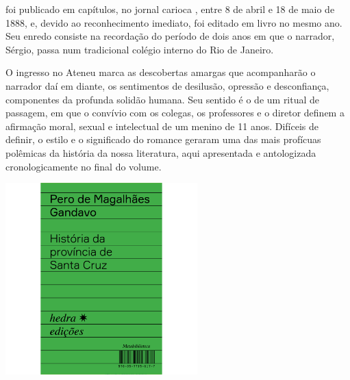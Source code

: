 \hspace*{-7cm}\hrulefill\hspace*{-7cm}

\medskip

 foi publicado em capítulos,
no jornal carioca {}, entre 8 de abril e 18 de maio de 1888, e,
devido ao reconhecimento imediato, foi editado em livro no mesmo ano.
 Seu
enredo consiste na recordação do período de dois anos em que o narrador,
Sérgio, passa num tradicional colégio interno do Rio de Janeiro.

O ingresso no Ateneu marca as descobertas amargas que acompanharão o
narrador daí em diante, os sentimentos de desilusão, opressão e
desconfiança, componentes da profunda solidão humana. Seu sentido é o
de um ritual de passagem, em que o convívio com os colegas, os
professores e o diretor definem a afirmação moral, sexual e intelectual
de um menino de 11 anos. Difíceis de definir, o estilo e o
significado do romance geraram uma das mais profícuas polêmicas da
história da nossa literatura, aqui apresentada e antologizada
cronologicamente no final do volume.


\vfill

\hspace*{-.4cm}\begin{minipage}[c]{.5\linewidth}
\small{
{}}
\end{minipage}

\pagebreak

\begin{center}
\hspace*{.5cm}\includegraphics[width=74mm]{./grid/gandavo.jpg}
\end{center}

